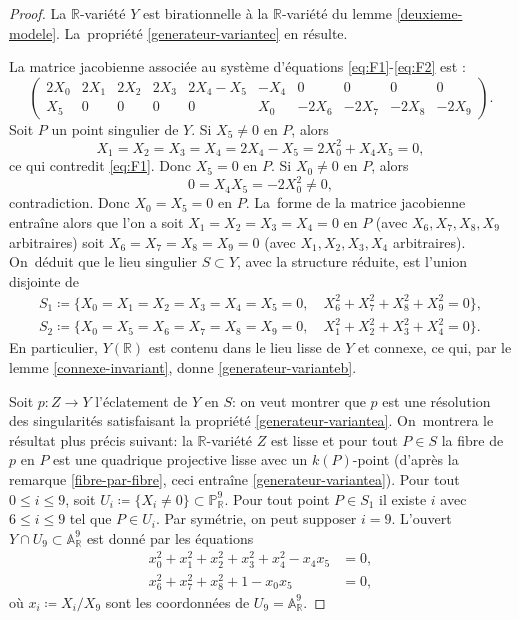\documentclass[JEP,XML,SOM,Unicode,francais,published]{cedram}
\theoremstyle{definition}
\newcommand{\R}{\mathbb R}
\newcommand{\A}{\mathbb A}
\renewcommand{\P}{\mathbb P}
\begin{document}
\begin{proof}
La $\R$-variété $Y$ est birationnelle à la $\R$-variété du lemme \ref{deuxieme-modele}. La~propriété \eqref{generateur-variantec} en résulte.

La matrice jacobienne associée au système d'équations \eqref{eq:F1}-\eqref{eq:F2} est :
\[
 \begin{pmatrix} 2X_0 & 2X_1 & 2X_2 & 2X_3 & 2X_4-X_5 & -X_4 & 0 & 0 & 0 & 0 \\ X_5 & 0 & 0 & 0 & 0 & X_0 & -2X_6 & -2X_7 & -2X_8 & -2X_9 \end{pmatrix}. 
\]
Soit $P$ un point singulier de $Y$. Si $X_5\neq 0$ en $P$, alors
\[X_1=X_2=X_3=X_4=2X_4-X_5=2X_0^2+X_4X_5=0,\] ce qui contredit \eqref{eq:F1}. Donc $X_5=0$ en $P$. Si $X_0\neq 0$ en $P$, alors \[0=X_4X_5=-2X_0^2\neq 0,\] contradiction. Donc $X_0=X_5=0$ en $P$. La~forme de la matrice jacobienne entraîne alors que l'on a soit $X_1=X_2=X_3=X_4=0$ en $P$ (avec $X_6,X_7,X_8,X_9$ arbitraires) soit $X_6=X_7=X_8=X_9=0$ (avec $X_1,X_2,X_3,X_4$ arbitraires). On~déduit que le lieu singulier $S\subset Y$, avec la structure réduite, est l'union disjointe de
\begin{align*}
S_1\coloneqq \{ X_0=X_1=X_2=X_3=X_4=X_5=0, \quad X_6^2+X_7^2+X_8^2+X_9^2=0\},\\
S_2\coloneqq\{ X_0=X_5=X_6=X_7=X_8=X_9=0, \quad X_1^2+X_2^2+X_3^2+X_4^2=0\}.
\end{align*}
En particulier, $Y(\R)$ est contenu dans le lieu lisse de $Y$ et connexe, ce qui, par le lemme \ref{connexe-invariant}, donne \eqref{generateur-varianteb}.

Soit $p\colon Z\to Y$ l'éclatement de $Y$ en $S$: on veut montrer que $p$ est une résolution des singularités satisfaisant la propriété \eqref{generateur-variantea}. On~montrera le résultat plus précis suivant: la $\R$-variété $Z$ est lisse et pour tout $P\in S$ la fibre de $p$ en $P$ est une quadrique projective lisse avec un $k(P)$-point (d'après la remarque \ref{fibre-par-fibre}, ceci entraîne \eqref{generateur-variantea}). Pour tout $0\leq i\leq 9$, soit $U_i\coloneqq \{X_i\neq 0\}\subset \P^9_\R$. Pour tout point $P\in S_1$ il existe $i$ avec $6\leq i\leq 9$ tel que $P\in U_i$. Par symétrie, on peut supposer $i=9$. L'ouvert $Y\cap U_9\subset \A^9_\R$ est donné par les équations
\begin{align*}
x_0^2+x_1^2+x_2^2+x_3^2+x_4^2-x_4x_5 &= 0,\\
x_6^2+x_7^2+x_8^2+1-x_0x_5&= 0,
\end{align*}
où $x_i\coloneqq X_i/X_9$ sont les coordonnées de $U_9=\A^9_\R$.


\end{proof}
\end{document}
